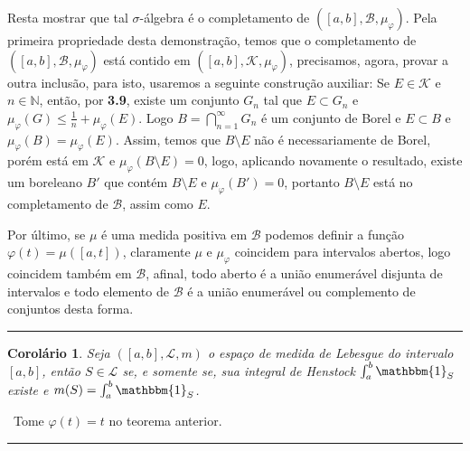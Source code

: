 \documentclass[12pt, a4paper]{article}
\newtheorem{cor}[mydef]{Corolário}
\def\dem{\par\smallbreak\noindent {\textit{ Demonstração:}} \ }
\def\eop{\hfill\rule{2.5mm}{2.5mm}}
\theoremstyle{definition}
\begin{document}
Resta mostrar que tal $\sigma$-álgebra é o completamento de $([a,b],\mathcal{B},\mu_\varphi)$. Pela primeira propriedade desta demonstração, temos que o completamento de $([a,b],\mathcal{B},\mu_\varphi)$ está contido em $([a,b],\mathcal{K},\mu_\varphi)$, precisamos, agora, provar a outra inclusão, para isto, usaremos a seguinte construção auxiliar: Se $E\in \mathcal{K}$ e $n\in \mathbb{N}$, então, por \textbf{3.9}, existe um conjunto $G_n$ tal que $E\subset G_n$ e $\mu_\varphi (G)\leq \frac{1}{n} +\mu_\varphi (E)$. Logo $B=\bigcap_{n=1}^{\infty}G_n$ é um conjunto de Borel e $E\subset B$ e $\mu_\varphi (B)=\mu_\varphi (E)$. Assim, temos que $B\setminus E$ não é necessariamente de Borel, porém está em $\mathcal{K}$ e $\mu_\varphi (B\setminus E)=0$, logo, aplicando novamente o resultado, existe um boreleano $B'$ que contém $B\setminus E$ e $\mu_\varphi (B')=0$, portanto $B\setminus E$ está no completamento de $\mathcal{B}$, assim como $E$. 

Por último, se $\mu$ é uma medida positiva em $\mathcal{B}$ podemos definir a função $\varphi(t)=\mu([a,t])$, claramente $\mu$ e $\mu_\varphi$ coincidem para intervalos abertos, logo coincidem também em $\mathcal{B}$, afinal, todo aberto é a união enumerável disjunta de intervalos e todo elemento de $\mathcal{B}$ é a união enumerável ou complemento de conjuntos desta forma. \eop




\begin{cor}
	
	Seja $([a,b],\mathcal{L},m)$ o espaço de medida de Lebesgue do intervalo $[a,b]$, então $S\in \mathcal{L}$ se, e somente se, sua integral de Henstock $\int_a^b \mathbbm{1}_S$ existe e $m(S)=\int_a^b \mathbbm{1}_S$.
	
\end{cor}

\dem Tome $\varphi (t)=t$ no teorema anterior. \eop \\
\end{document}
